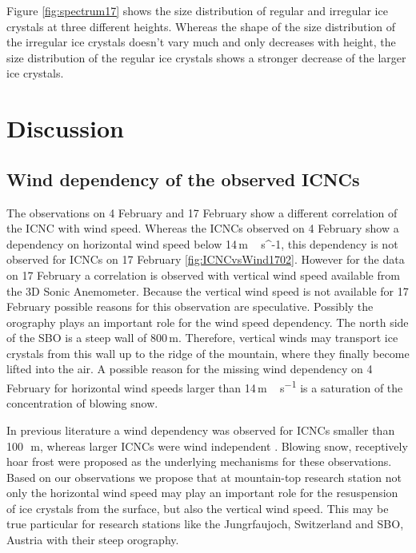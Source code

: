 \documentclass[draft,linenumbers]{agujournal}
\begin{document}
Figure \ref{fig:spectrum17} shows the size distribution of regular and irregular ice crystals at three different heights. Whereas the shape of the size distribution of the irregular ice crystals doesn't vary much and only decreases with height, the size distribution of the regular ice crystals shows a stronger decrease of the larger ice crystals. 

\section{Discussion}
\label{Discussion}

\subsection{Wind dependency of the observed ICNCs}

The observations on 4 February and 17 February show a different correlation of the ICNC with wind speed. Whereas the ICNCs observed on 4 February show a dependency on horizontal wind speed below 14\,\si{m\,{s^{-1}}}, this dependency is not observed for ICNCs on 17 February \ref{fig:ICNCvsWind1702}. However for the data on 17 February a correlation is observed with vertical wind speed available from the 3D Sonic Anemometer. Because the vertical wind speed is not available for 17 February possible reasons for this observation are speculative. Possibly the orography plays an important role for the wind speed dependency. The north side of the SBO is a steep wall of 800\,\si{m}. Therefore, vertical winds may transport ice crystals from this wall up to the ridge of the mountain, where they finally become lifted into the air. A possible reason for the missing wind dependency on 4 February for horizontal wind speeds larger than 14\,\si{m\,s^{-1}} is a saturation of the concentration of blowing snow.

In previous literature a wind dependency was observed for ICNCs smaller than 100\,\si{\mu m}, whereas larger ICNCs were wind independent \citep{Loy15}. Blowing snow, receptively hoar frost were proposed as the underlying mechanisms for these observations. Based on our observations we propose that at mountain-top research station not only the horizontal wind speed may play an important role for the resuspension of ice crystals from the surface, but also the vertical wind speed. This may be true particular for research stations like the Jungrfaujoch, Switzerland and SBO, Austria with their steep orography. 
\end{document}
